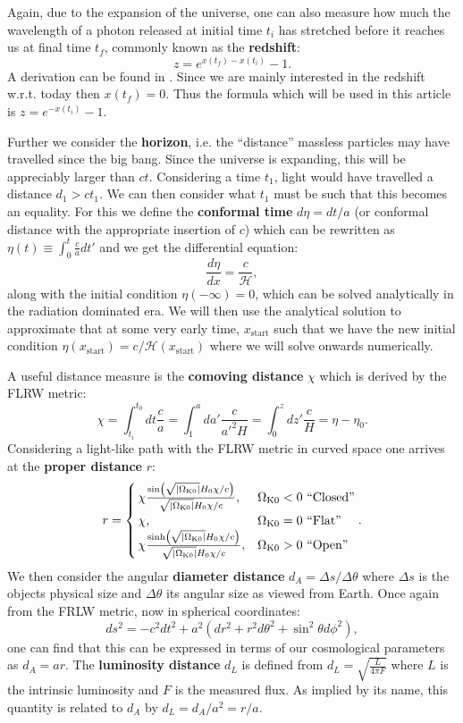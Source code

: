 \documentclass[%
reprint,
 amsmath,amssymb,
 aps,
]{revtex4-2}
\newcommand{\Hp}{\mathcal{H}}
\begin{document}
Again, due to the expansion of the universe, one can also measure how much the wavelength of a photon released at initial time $t_i$ has stretched before it reaches us at final time $t_f$, commonly known as the \textbf{redshift}:
\[z=e^{x(t_f)-x(t_i)}-1.\]
A derivation can be found in \cite{Davis_2004}. Since we are mainly interested in the redshift w.r.t. today then $x(t_f)=0$. Thus the formula which will be used in this article is $z=e^{-x(t_i)}-1$.

Further we consider the \textbf{horizon}, i.e. the ``distance'' massless particles may have travelled since the big bang. Since the universe is expanding, this will be appreciably larger than $ct$. Considering a time $t_1$, light would have travelled a distance $d_1>ct_1$. We can then consider what $t_1$ must be such that this becomes an equality. For this we define the \textbf{conformal time} $d\eta=dt/a$ (or conformal distance with the appropriate insertion of $c$) which can be rewritten as $\eta(t)\equiv\int_0^t\frac{c}{a}dt'$ and we get the differential equation:
\begin{equation}
	\frac{d\eta}{dx}=\frac{c}{\Hp},\label{eq:detaODE}
\end{equation}
along with the initial condition $\eta(-\infty)=0$, which can be solved analytically in the radiation dominated era. We will then use the analytical solution to approximate that at some very early time, $x_\text{start}$ such that we have the new initial condition $\eta(x_\text{start})=c/\Hp(x_\text{start})$ where we will solve onwards numerically. 

A useful distance measure is the \textbf{comoving distance} $\chi$ which is derived by the FLRW metric:
\[\chi=\int_{t_i}^{t_0}dt\frac{c}{a}=\int_1^ada'\frac{c}{a'^2H}=\int_0^zdz'\frac{c}{H}=\eta-\eta_0.\]
Considering a light-like path with the FLRW metric in curved space one arrives at the \textbf{proper distance} $r$:
\[
r=
\begin{cases}
	\,\chi\frac{\sin(\sqrt{\left|\Omega_{\text K0}\right|}H_0\chi/c)}{\sqrt{\left|\Omega_{\text K0}\right|}H_0\chi/c},& \Omega_{\text K0}<0~\text{``Closed''}\\
	\,\chi, & \Omega_{\text K0}=0~\text{``Flat''}\\
	\,\chi\frac{\sinh(\sqrt{\left|\Omega_{\text K0}\right|}H_0\chi/c)}{\sqrt{\left|\Omega_{\text K0}\right|}H_0\chi/c},& \Omega_{\text K0}>0~\text{``Open''}
\end{cases}.
\]
We then consider the angular \textbf{diameter distance} $d_A=\Delta s/\Delta \theta$ where $\Delta s$ is the objects physical size and $\Delta \theta$ its angular size as viewed from Earth. Once again from the FRLW metric, now in spherical coordinates:
\[ds^2=-c^2dt^2+a^2(dr^2+r^2d\theta^2+\sin^2\theta d\phi^2),\]
one can find that this can be expressed in terms of our cosmological parameters as $d_A=ar$. The \textbf{luminosity distance} $d_L$ is defined from $d_L=\sqrt{\frac{L}{4\pi F}}$ where $L$ is the intrinsic luminosity and $F$ is the measured flux. As implied by its name, this quantity is related to $d_A$ by $d_L=d_A/a^2=r/a$. 
\end{document}
